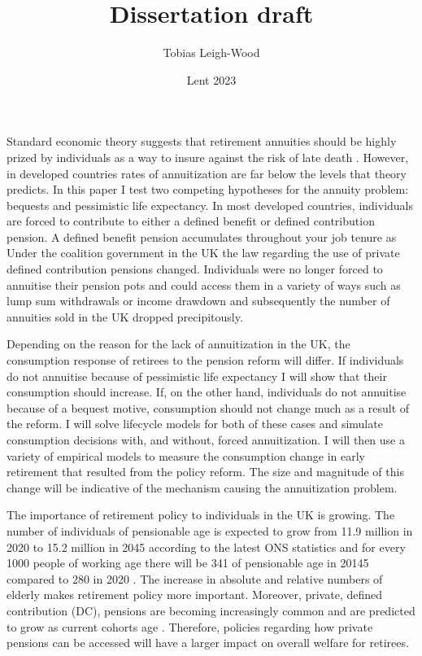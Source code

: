 \documentclass[12pt]{article}
\date{Lent 2023}
\title{Dissertation draft}
\author{Tobias Leigh-Wood}
\begin{document}
\maketitle


Standard economic theory suggests that retirement annuities should be highly prized by individuals as a way to
insure against the risk of late death \cite{yaari_65}. However, in developed countries rates of annuitization are far below the
levels that theory predicts. In this paper I test two competing hypotheses for the annuity problem: bequests and
pessimistic life expectancy. In most developed countries, individuals are forced to contribute to either a defined 
benefit or defined contribution pension. A defined benefit pension accumulates throughout your job tenure as  
 Under the coalition government in the UK the law regarding the use of private defined
contribution pensions changed. Individuals were no longer forced to annuitise their pension pots and could access
them in a variety of ways such as lump sum withdrawals or income drawdown and subsequently the number of annuities
sold in the UK dropped precipitously.


Depending on the reason for the lack of annuitization in the UK, the consumption response of retirees to the pension
reform will differ. If individuals do not annuitise because of pessimistic life expectancy I will show that their
consumption should increase. If, on the other hand, individuals do not annuitise because of a bequest motive, consumption
should not change much as a result of the reform. I will solve lifecycle models for both of these cases and simulate
consumption decisions with, and without, forced annuitization. I will then use a variety of empirical models to measure
the consumption change in early retirement that resulted from the policy reform. The size and magnitude of this change
will be indicative of the mechanism causing the annuitization problem.

The importance of retirement policy to individuals in the UK is growing. The number of individuals of
pensionable age is expected to grow from 11.9 million in 2020 to 15.2 million in
2045 according to the latest ONS statistics and for every 1000 people of working age there will be 341 of pensionable
age in 20145 compared to 280 in 2020 \cite{ons_population_predictions_2020}. The increase in absolute and relative
numbers of elderly makes retirement policy more important. Moreover, private, defined contribution (DC), pensions are
becoming increasingly common and are predicted to grow as current cohorts age \cite{cribb_karjalainen_ifs_2023}.
Therefore, policies regarding how private pensions can be accessed will have a larger impact on overall welfare for
retirees.
\end{document}
